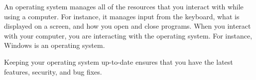 An operating system manages all of the resources that you interact with while using a computer. For instance, it manages input from the keyboard, what is displayed on a screen, and how you open and close programs. When you interact with your computer, you are interacting with the operating system. For instance, Windows is an operating system. 

Keeping your operating system up-to-date ensures that you have the latest features, security, and bug fixes.

